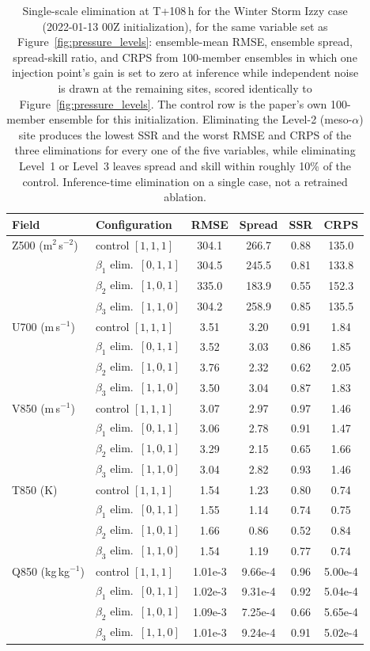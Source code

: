 \documentclass{agujournal2019}
\begin{document}
\begin{table}[h!]
\centering
\small
\begin{tabular}{llcccc}
\toprule
\textbf{Field} & \textbf{Configuration} & \textbf{RMSE} & \textbf{Spread} & \textbf{SSR} & \textbf{CRPS} \\
\midrule
Z500 (m$^2$\,s$^{-2}$) & control $[1,1,1]$ & 304.1 & 266.7 & 0.88 & 135.0 \\
 & $\beta_1$ elim.\ $[0,1,1]$ & 304.5 & 245.5 & 0.81 & 133.8 \\
 & $\beta_2$ elim.\ $[1,0,1]$ & 335.0 & 183.9 & 0.55 & 152.3 \\
 & $\beta_3$ elim.\ $[1,1,0]$ & 304.2 & 258.9 & 0.85 & 135.5 \\
\midrule
U700 (m\,s$^{-1}$) & control $[1,1,1]$ & 3.51 & 3.20 & 0.91 & 1.84 \\
 & $\beta_1$ elim.\ $[0,1,1]$ & 3.52 & 3.03 & 0.86 & 1.85 \\
 & $\beta_2$ elim.\ $[1,0,1]$ & 3.76 & 2.32 & 0.62 & 2.05 \\
 & $\beta_3$ elim.\ $[1,1,0]$ & 3.50 & 3.04 & 0.87 & 1.83 \\
\midrule
V850 (m\,s$^{-1}$) & control $[1,1,1]$ & 3.07 & 2.97 & 0.97 & 1.46 \\
 & $\beta_1$ elim.\ $[0,1,1]$ & 3.06 & 2.78 & 0.91 & 1.47 \\
 & $\beta_2$ elim.\ $[1,0,1]$ & 3.29 & 2.15 & 0.65 & 1.66 \\
 & $\beta_3$ elim.\ $[1,1,0]$ & 3.04 & 2.82 & 0.93 & 1.46 \\
\midrule
T850 (K) & control $[1,1,1]$ & 1.54 & 1.23 & 0.80 & 0.74 \\
 & $\beta_1$ elim.\ $[0,1,1]$ & 1.55 & 1.14 & 0.74 & 0.75 \\
 & $\beta_2$ elim.\ $[1,0,1]$ & 1.66 & 0.86 & 0.52 & 0.84 \\
 & $\beta_3$ elim.\ $[1,1,0]$ & 1.54 & 1.19 & 0.77 & 0.74 \\
\midrule
Q850 (kg\,kg$^{-1}$) & control $[1,1,1]$ & 1.01e-3 & 9.66e-4 & 0.96 & 5.00e-4 \\
 & $\beta_1$ elim.\ $[0,1,1]$ & 1.02e-3 & 9.31e-4 & 0.92 & 5.04e-4 \\
 & $\beta_2$ elim.\ $[1,0,1]$ & 1.09e-3 & 7.25e-4 & 0.66 & 5.65e-4 \\
 & $\beta_3$ elim.\ $[1,1,0]$ & 1.01e-3 & 9.24e-4 & 0.91 & 5.02e-4 \\
\bottomrule
\end{tabular}
\caption{Single-scale elimination at T+108\,h for the Winter Storm Izzy case (2022-01-13 00Z initialization), for the same variable set as Figure~\ref{fig:pressure_levels}: ensemble-mean RMSE, ensemble spread, spread-skill ratio, and CRPS from 100-member ensembles in which one injection point's gain is set to zero at inference while independent noise is drawn at the remaining sites, scored identically to Figure~\ref{fig:pressure_levels}. The control row is the paper's own 100-member ensemble for this initialization. Eliminating the Level-2 (meso-$\alpha$) site produces the lowest SSR and the worst RMSE and CRPS of the three eliminations for every one of the five variables, while eliminating Level~1 or Level~3 leaves spread and skill within roughly 10\% of the control. Inference-time elimination on a single case, not a retrained ablation.}

\end{table}
\end{document}
